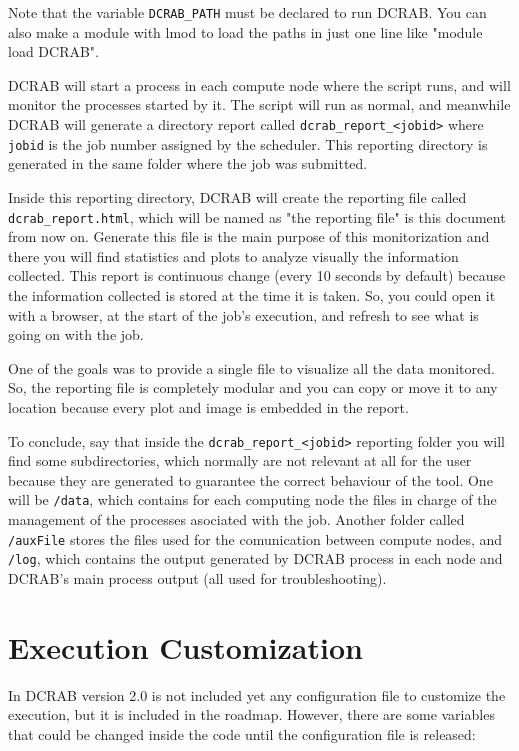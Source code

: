 \documentclass[10pt,a4paper]{report}
\begin{document}
Note that the variable \verb+DCRAB_PATH+ must be declared to run DCRAB. You can also make a module with lmod to load the paths in just one line like "module load DCRAB".

DCRAB will start a process in each compute node where the script runs, and will monitor the processes started by it. The script will run as normal, and meanwhile DCRAB will generate a directory report called \verb+dcrab_report_<jobid>+ where \verb+jobid+ is the job number assigned by the scheduler. This reporting directory is generated in the same folder where the job was submitted.

\sloppy Inside this reporting directory, DCRAB will create the reporting file called \verb+dcrab_report.html+, which will be named as "the reporting file" is this document from now on. Generate this file is the main purpose of this monitorization and there you will find statistics and plots to analyze visually the information collected. This report is continuous change (every 10 seconds by default) because the information collected is stored at the time it is taken. So, you could open it with a browser, at the start of the job's execution, and refresh to see what is going on with the job.

One of the goals was to provide a single file to visualize all the data monitored. So, the reporting file is completely modular and you can copy or move it to any location because every plot and image is embedded in the report.

To conclude, say that inside the \verb+dcrab_report_<jobid>+ reporting folder you will find some subdirectories, which normally are not relevant at all for the user because they are generated to guarantee the correct behaviour of the tool. One will be \verb+/data+, which contains for each computing node the files in charge of the management of the processes asociated with the job. Another folder called \verb+/auxFile+ stores the files used for the comunication between compute nodes, and \verb+/log+, which contains the output generated by DCRAB process in each node and DCRAB's main process output (all used for troubleshooting).

\section{Execution Customization}

In DCRAB version 2.0 is not included yet any configuration file to customize the execution, but it is included in the roadmap. However, there are some variables that could be changed inside the code until the configuration file is released:
\end{document}
